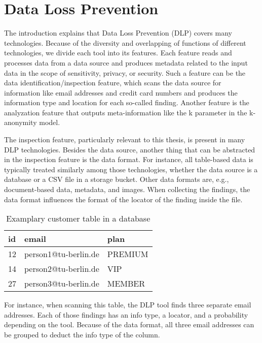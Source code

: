 \section{Data Loss Prevention}
The introduction explains that Data Loss Prevention (DLP) covers many technologies. Because of the diversity and overlapping of functions of different technologies, we divide each tool into its features. Each feature reads and processes data from a data source and produces metadata related to the input data in the scope of sensitivity, privacy, or security. Such a feature can be the data identification/inspection feature, which scans the data source for information like email addresses and credit card numbers and produces the information type and location for each so-called finding. Another feature is the analyzation feature that outputs meta-information like the k parameter in the k-anonymity model. 

The inspection feature, particularly relevant to this thesis, is present in many DLP technologies. Besides the data source, another thing that can be abstracted in the inspection feature is the data format. For instance, all table-based data is typically treated similarly among those technologies, whether the data source is a database or a CSV file in a storage bucket. Other data formats are, e.g., document-based data, metadata, and images. When collecting the findings, the data format influences the format of the locator of the finding inside the file.

\begin{table}[h]
    \centering
    \begin{tabularx}{\linewidth}{ lXX }
        \textbf{id} & \textbf{email} & \textbf{plan} \\
        \hline
        12 & person1@tu-berlin.de & PREMIUM \\
        \hline
        14 & person2@tu-berlin.de & VIP \\
        \hline
        27 & person3@tu-berlin.de & MEMBER \\
    \end{tabularx}
    \caption{Examplary customer table in a database}
    \label{tab:dlp-example-1}
\end{table}

For instance, when scanning this table, the DLP tool finds three separate email addresses. Each of those findings has an info type, a locator, and a probability depending on the tool. Because of the data format, all three email addresses can be grouped to deduct the info type of the column.

